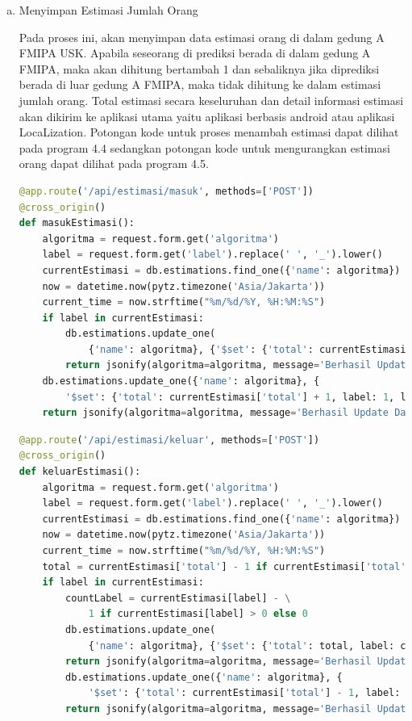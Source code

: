 \begin{enumerate}[1.]
\begin{enumerate}[a.]
		      \item Menyimpan Estimasi Jumlah Orang
		            \par Pada proses ini, akan menyimpan data estimasi orang di dalam gedung A FMIPA USK. Apabila seseorang di prediksi berada di dalam gedung A FMIPA, maka akan dihitung bertambah 1 dan sebaliknya jika diprediksi berada di luar gedung A FMIPA, maka tidak dihitung ke dalam estimasi jumlah orang. Total estimasi secara keseluruhan dan detail informasi estimasi akan dikirim ke aplikasi utama yaitu aplikasi berbasis android atau aplikasi LocaLization. Potongan kode untuk proses menambah estimasi dapat dilihat pada program 4.4 sedangkan potongan kode untuk mengurangkan estimasi orang dapat dilihat pada program 4.5.
		            \begin{lstlisting}[language=Python]
@app.route('/api/estimasi/masuk', methods=['POST'])
@cross_origin()
def masukEstimasi():
	algoritma = request.form.get('algoritma')
	label = request.form.get('label').replace(' ', '_').lower()
	currentEstimasi = db.estimations.find_one({'name': algoritma})
	now = datetime.now(pytz.timezone('Asia/Jakarta'))
	current_time = now.strftime("%m/%d/%Y, %H:%M:%S")
	if label in currentEstimasi:
		db.estimations.update_one(
			{'name': algoritma}, {'$set': {'total': currentEstimasi['total'] + 1, label: currentEstimasi[label] + 1, label+'_time': current_time, 'total_time': current_time}})
		return jsonify(algoritma=algoritma, message='Berhasil Update Data')
	db.estimations.update_one({'name': algoritma}, {
		'$set': {'total': currentEstimasi['total'] + 1, label: 1, label+'_time': current_time, 'total_time': current_time}})
	return jsonify(algoritma=algoritma, message='Berhasil Update Data')		\end{lstlisting}

		            \begin{lstlisting}[language=Python]
@app.route('/api/estimasi/keluar', methods=['POST'])
@cross_origin()
def keluarEstimasi():
	algoritma = request.form.get('algoritma')
	label = request.form.get('label').replace(' ', '_').lower()
	currentEstimasi = db.estimations.find_one({'name': algoritma})
	now = datetime.now(pytz.timezone('Asia/Jakarta'))
	current_time = now.strftime("%m/%d/%Y, %H:%M:%S")
	total = currentEstimasi['total'] - 1 if currentEstimasi['total'] > 0 else 0
	if label in currentEstimasi:
		countLabel = currentEstimasi[label] - \
			1 if currentEstimasi[label] > 0 else 0
		db.estimations.update_one(
			{'name': algoritma}, {'$set': {'total': total, label: countLabel, label+'_time': current_time, 'total_time': current_time}})
		return jsonify(algoritma=algoritma, message='Berhasil Update Data')
		db.estimations.update_one({'name': algoritma}, {
			'$set': {'total': currentEstimasi['total'] - 1, label: 0, label+'_time': current_time, 'total_time': current_time}})
		return jsonify(algoritma=algoritma, message='Berhasil Update Data')		\end{lstlisting}


\end{enumerate}
\end{enumerate}

